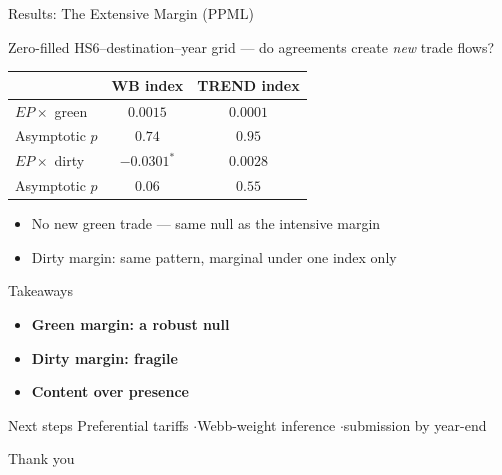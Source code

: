 \documentclass{beamer}
\begin{document}
\begin{frame}{Results: The Extensive Margin (PPML)}

  \small Zero-filled HS6--destination--year grid --- do agreements create
  \emph{new} trade flows?
  \normalsize

  \vspace{1em}
  \begin{center}
  \begin{tabular}{lcc}
    \toprule
     & WB index & TREND index \\
    \midrule
    $EP\times$ green & $0.0015$ & $0.0001$ \\
    Asymptotic $p$    & $0.74$ & $0.95$ \\[6pt]
    $EP\times$ dirty  & $-0.0301^{*}$ & $0.0028$ \\
    Asymptotic $p$    & $0.06$ & $0.55$ \\
    \bottomrule
  \end{tabular}
  \end{center}

  \vspace{1.5em}
  \begin{itemize}\setlength\itemsep{8pt}
    \item No new green trade --- same null as the intensive margin
    \item Dirty margin: same pattern, marginal under one index only
  \end{itemize}

\end{frame}

\begin{frame}{Takeaways}

  \begin{itemize}\setlength\itemsep{16pt}
    \item \textbf{Green margin: a robust null}
    \item \textbf{Dirty margin: fragile}
    \item \textbf{Content over presence}
  \end{itemize}

  \vspace{1.5em}
  \begin{alertblock}{Next steps}
    Preferential tariffs \quad$\cdot$\quad Webb-weight inference \quad$\cdot$\quad submission by year-end
  \end{alertblock}

  \vspace{1.5em}
  \begin{center}
    \Large Thank you
  \end{center}

\end{frame}
\end{document}
